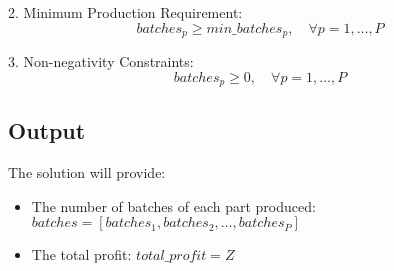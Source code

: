 \documentclass{article}
\begin{document}
2. Minimum Production Requirement:
   \[
   batches_{p} \geq min\_batches_{p}, \quad \forall p = 1, \ldots, P
   \]

3. Non-negativity Constraints:
   \[
   batches_{p} \geq 0, \quad \forall p = 1, \ldots, P
   \]

\subsection*{Output}
The solution will provide:
\begin{itemize}
    \item The number of batches of each part produced: \( batches = [batches_{1}, batches_{2}, \ldots, batches_{P}] \)
    \item The total profit: \( total\_profit = Z \)
\end{itemize}
\end{document}
